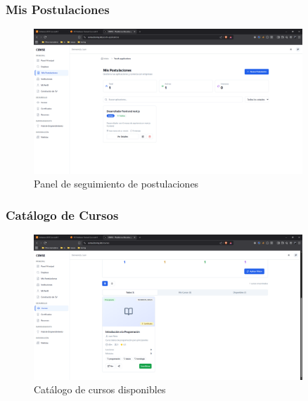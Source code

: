 \documentclass[12pt,a4paper]{article}
\begin{document}
\begin{enumerate}
\subsubsection{Mis Postulaciones}
\begin{figure}[H]
    \centering
    \includegraphics[width=0.9\textwidth]{screenshots/youth/my-applications.png}
    \caption{Panel de seguimiento de postulaciones}
    \label{fig:youth-applications}
\end{figure}

\subsubsection{Catálogo de Cursos}
\begin{figure}[H]
    \centering
    \includegraphics[width=0.9\textwidth]{screenshots/youth/courses.png}
    \caption{Catálogo de cursos disponibles}
    \label{fig:youth-courses}
\end{figure}


\end{enumerate}
\end{document}
